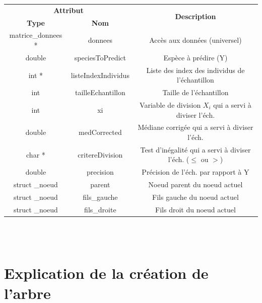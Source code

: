 \begin{tabular}{|c|c|c|}
	\hline
	\multicolumn{2}{|c|}{\textbf{Attribut}} & \multirow{2}{2cm}{\textbf{Description}}\\
	\cline{1-2}
	\textbf{Type} & \textbf{Nom} &\\
	\hline
	matrice\_donnees * & donnees & Accès aux données (universel)\\
	\hline
	double & speciesToPredict & Espèce à prédire (Y)\\
	\hline
	int * & listeIndexIndividus & Liste des index des individus de l'échantillon\\
	\hline
	int & tailleEchantillon & Taille de l'échantillon\\
	\hline
	int & xi & Variable de division $X_{i}$ qui a servi à diviser l'éch.\\
	\hline
	double & medCorrected & Médiane corrigée qui a servi à diviser l'éch.\\
	\hline
	char * & critereDivision & Test d'inégalité qui a servi à diviser l'éch. ($\le$ ou $>$)\\
	\hline
	double & precision & Précision de l'éch. par rapport à Y\\
	\hline
	struct \_noeud & parent & Noeud parent du noeud actuel\\
	\hline
	struct \_noeud & fils\_gauche & Fils gauche du noeud actuel\\
	\hline
	struct \_noeud & fils\_droite & Fils droit du noeud actuel\\
	\hline
\end{tabular}\\\\

\chapter*{\textcolor{carmillon}{Explication de la création de l'arbre}}

